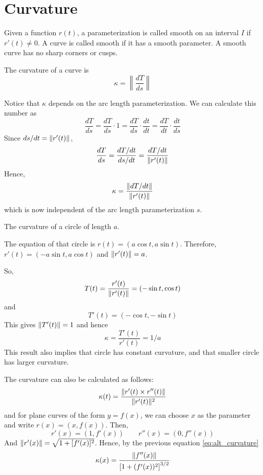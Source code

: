 \section{Curvature}

\begin{definition}[Smoothness]
Given a function $r(t)$, a parameterization is called smooth on an interval $I$ if $r'(t) \neq 0$. A curve is called smooth if it has a smooth parameter. A smooth curve has no sharp corners or cusps.
\end{definition}

\begin{definition}[Curvature]
The curvature of a curve is
$$
\kappa = \left\lVert{\frac{dT}{ds}}\right\rVert
$$
\end{definition}

Notice that $\kappa$ depends on the arc length parameterization. We can calculate this number as
$$
\frac{dT}{ds} = \frac{dT}{ds} \cdot 1 = \frac{dT}{ds}\cdot \frac{dt}{dt} = \frac{dT}{dt} \cdot \frac{dt}{ds}
$$
Since $ds/dt = \lVert r'(t) \rVert$,
$$
\frac{dT}{ds} = \frac{dT/dt}{ds/dt} = \frac{dT/dt}{\lVert r'(t) \rVert}
$$
Hence,
$$
\kappa = \frac{\lVert dT/dt \rVert}{\lVert r'(t) \rVert}
$$
which is now independent of the arc length parameterization $s$.

\begin{example}
The curvature of a circle of length $a$.

The equation of that circle is $r(t) = (a\cos t, a\sin t)$. Therefore, $r'(t)=(-a\sin t,a \cos t)$ and $\lVert r'(t) \rVert=a$.

So,
$$
T(t)=\frac{r'(t)}{\lVert r'(t) \rVert} = (-\sin t, \cos t)
$$
and
$$
T'(t)=(-\cos t, -\sin t)
$$
This gives $\lVert T'(t) \rVert = 1$ and hence
$$
\kappa = \frac{T'(t)}{r'(t)} = 1/a
$$
This result also implies that circle has constant curvature, and that smaller circle has larger curvature.
\end{example}

\begin{theorem} \label{eq:alt_curvature}
The curvature can also be calculated as follows:
$$
\kappa(t) = \frac{\lVert r'(t) \times r''(t) \rVert}{\lVert r'(t) \rVert^2}
$$
and for plane curves of the form $y = f(x)$, we can choose $x$ as the parameter and write $r(x) = (x,f(x))$. Then,
$$
r'(x) = (1, f'(x)) \qquad r''(x)=(0,f''(x))
$$
And $\lVert r'(x) \rVert = \sqrt{1+[f'(x)]^2}$. Hence, by the previous equation \eqref{eq:alt_curvature}
$$
\kappa(x) = \frac{\lVert f''(x) \rVert}{\left[ 1+(f'(x))^2 \right]^{3/2}}
$$
\end{theorem}

